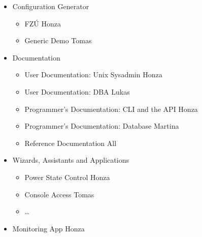 \documentclass{article}
\begin{document}
\begin{itemize}
\begin{itemize}
        \end{itemize}
    \item Configuration Generator
        \begin{itemize}
            \item FZÚ \tab Honza
            \item Generic Demo \tab Tomas
        \end{itemize}
    \item Documentation
        \begin{itemize}
            \item User Documentation: Unix Sysadmin \tab Honza
            \item User Documentation: DBA \tab Lukas
            \item Programmer's Documentation: CLI and the API \tab Honza
            \item Programmer's Documentation: Database \tab Martina
            \item Reference Documentation \tab All
        \end{itemize}
    \item Wizards, Assistants and Applications
        \begin{itemize}
            \item Power State Control \tab Honza
            \item Console Access \tab Tomas
            \item \ldots
        \end{itemize}
    \item Monitoring App \tab Honza
\end{itemize}
\end{document}
